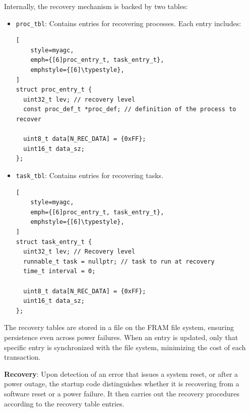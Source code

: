 Internally, the recovery mechanism is backed by two tables:
\begin{itemize}[left=0pt]
    \item \lstinline[style=myagc]|proc_tbl|: Contains entries for recovering processes.
        Each entry includes:
\begin{lstlisting}[
    style=myagc,
    emph={[6]proc_entry_t, task_entry_t},
    emphstyle={[6]\typestyle},
]
struct proc_entry_t {
  uint32_t lev; // recovery level
  const proc_def_t *proc_def; // definition of the process to recover

  uint8_t data[N_REC_DATA] = {0xFF};
  uint16_t data_sz;
};
\end{lstlisting}

    \item \lstinline[style=myagc]|task_tbl|: Contains entries for recovering tasks.
\begin{lstlisting}[
    style=myagc,
    emph={[6]proc_entry_t, task_entry_t},
    emphstyle={[6]\typestyle},
]
struct task_entry_t {
  uint32_t lev; // Recovery level
  runnable_t task = nullptr; // task to run at recovery
  time_t interval = 0;

  uint8_t data[N_REC_DATA] = {0xFF};
  uint16_t data_sz;
};
\end{lstlisting}
\end{itemize}

The recovery tables are stored in a file on the FRAM file system, ensuring persistence
even across power failures. When an entry is updated, only that specific entry is
synchronized with the file system, minimizing the cost of each transaction.

\textbf{Recovery}: Upon detection of an error that issues a system reset, or after a
power outage, the startup code distinguishes whether it is recovering from a software
reset or a power failure. It then carries out the recovery procedures according to the
recovery table entries.


